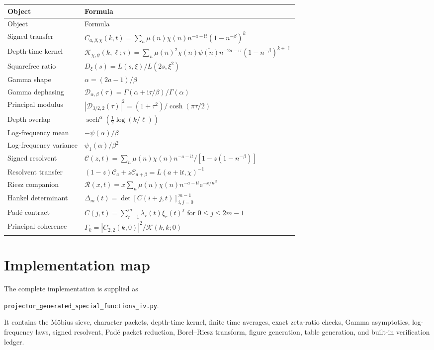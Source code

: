 \documentclass[11pt,openany]{report}
\theoremstyle{definition}
\theoremstyle{remark}
\newcommand{\e}{\mathrm e}
\newcommand{\ii}{\mathrm i}
\newcommand{\Kcal}{\mathcal K}
\newcommand{\Ccal}{\mathcal C}
\newcommand{\Dcal}{\mathcal D}
\newcommand{\abs}[1]{\left\lvert#1\right\rvert}
\newcommand{\sech}{\operatorname{sech}}
\begin{document}
\begin{longtable}{L{0.30\textwidth}L{0.61\textwidth}}
\toprule
Object & Formula\\
\midrule
\endfirsthead
\toprule
Object & Formula\\
\midrule
\endhead
Signed transfer & $C_{a,\beta,\chi}(k,t)=\sum_n\mu(n)\chi(n)n^{-a-\ii t}(1-n^{-\beta})^k$\\
Depth-time kernel & $\Kcal_{\chi,\psi}(k,\ell;\tau)=\sum_n\mu(n)^2\chi(n)\overline{\psi(n)}n^{-2a-\ii\tau}(1-n^{-\beta})^{k+\ell}$\\
Squarefree ratio & $D_\xi(s)=L(s,\xi)/L(2s,\xi^2)$\\
Gamma shape & $\alpha=(2a-1)/\beta$\\
Gamma dephasing & $\Dcal_{\alpha,\beta}(\tau)=\Gamma(\alpha+\ii\tau/\beta)/\Gamma(\alpha)$\\
Principal modulus & $\abs{\Dcal_{3/2,2}(\tau)}^2=(1+\tau^2)/\cosh(\pi\tau/2)$\\
Depth overlap & $\sech^\alpha(\tfrac12\log(k/\ell))$\\
Log-frequency mean & $-\psi(\alpha)/\beta$\\
Log-frequency variance & $\psi_1(\alpha)/\beta^2$\\
Signed resolvent & $\Ccal(z,t)=\sum_n\mu(n)\chi(n)n^{-a-\ii t}/[1-z(1-n^{-\beta})]$\\
Resolvent transfer & $(1-z)\Ccal_a+z\Ccal_{a+\beta}=L(a+\ii t,\chi)^{-1}$\\
Riesz companion & $\mathcal R(x,t)=x\sum_n\mu(n)\chi(n)n^{-a-\ii t}\e^{-x/n^\beta}$\\
Hankel determinant & $\Delta_m(t)=\det[C(i+j,t)]_{i,j=0}^{m-1}$\\
Pad\'e contract & $C(j,t)=\sum_{r=1}^{m}\lambda_r(t)\xi_r(t)^j$ for $0\le j\le2m-1$\\
Principal coherence & $\Gamma_k=\abs{C_{2,2}(k,0)}^2/\Kcal(k,k;0)$\\
\bottomrule
\end{longtable}

\chapter{Implementation map}

The complete implementation is supplied as
\begin{center}
\texttt{projector\_generated\_special\_functions\_iv.py}.
\end{center}
It contains the M\"obius sieve, character packets, depth-time kernel, finite time averages, exact zeta-ratio checks, Gamma asymptotics, log-frequency laws, signed resolvent, Pad\'e packet reduction, Borel--Riesz transform, figure generation, table generation, and built-in verification ledger.
\end{document}
